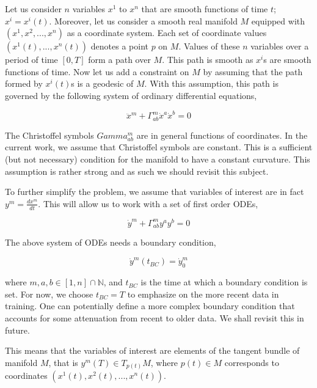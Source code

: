 \documentclass{article}
\begin{document}
Let us consider $n$ variables $x^{1}$ to $x^{n}$ that are smooth
functions of time $t$; $x^{i} = x^{i}(t)$. Moreover, let us consider a
smooth real manifold $M$ equipped with $(x^{1},x^{2},...,x^{n})$ as a
coordinate system. Each set of coordinate values
$(x^{1}(t),...,x^{n}(t))$ denotes a point $p$ on $M$. Values of these
$n$ variables over a period of time $[0,T]$ form a path over $M$. This
path is smooth as $x^{i}$s are smooth functions of time. Now let us
add a constraint on $M$ by assuming that the path formed by
$x^{i}(t)$s is a geodesic of $M$. With this assumption, this path is
governed by the following system of ordinary differential equations,

\begin{equation}\label{eqn:geodesic}
\ddot{x}^{m} + \Gamma^{m}_{ab} \dot{x}^{a} \dot{x}^{b} = 0
\end{equation}

The Christoffel symbols $Gamma^{m}_{ab}$ are in general functions of
coordinates. In the current work, we assume that Christoffel symbols
are constant. This is a sufficient (but not necessary) condition for
the manifold to have a constant curvature. This assumption is rather
strong and as such we should revisit this subject.

To further simplify the problem, we assume that variables of interest
are in fact $y^{m} = \frac{dx^{m}}{dt}$. This will allow us to work
with a set of first order ODEs,

\begin{equation}\label{eqn:geodesic-1st-order}
\dot{y}^{m} + \Gamma^{m}_{ab} y^{a} y^{b} = 0
\end{equation}

The above system of ODEs needs a boundary condition,

\begin{equation}\label{eqn:geodesic-bc}
\dot{y}^{m}(t_{BC}) = \dot{y}^{m}_{0}
\end{equation}

where $m,a,b \in [1,n] \cap \mathbb{N}$, and $t_{BC}$ is the time at
which a boundary condition is set. For now, we choose $t_{BC} = T$ to
emphasize on the more recent data in training. One can potentially
define a more complex boundary condition that accounts for some
attenuation from recent to older data. We shall revisit this in
future.

This means that the variables of interest are elements of the tangent
bundle of manifold $M$, that is $y^{m}(T) \in T_{p(t)}M$, where $p(t) \in M$
corresponds to coordinates $(x^{1}(t),x^{2}(t),...,x^{n}(t))$.
\end{document}
